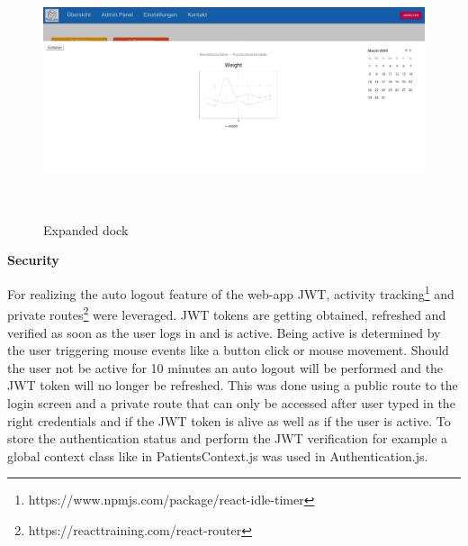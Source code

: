 \begin{figure}[h]
	\centering
	\includegraphics[width=6.69in,height=2.93in]{./media/image6.png}
	\caption{Expanded dock}
\end{figure}


\textbf{Security}

For realizing the auto logout feature of the web-app JWT, activity tracking\footnote{https://www.npmjs.com/package/react-idle-timer} and private routes\footnote{https://reacttraining.com/react-router} were leveraged. JWT tokens are getting obtained, refreshed and verified as soon as the user logs in and is active. Being active is determined by the user triggering mouse events like a button click or mouse movement. Should the user not be active for 10 minutes an auto logout will be performed and the JWT token will no longer be refreshed. This was done using a public route to the login screen and a private route that can only be accessed after user typed in the right credentials and if the JWT token is alive as well as if the user is active. To store the authentication status and perform the JWT verification for example a global context class like in PatientsContext.js was used in Authentication.js. 

